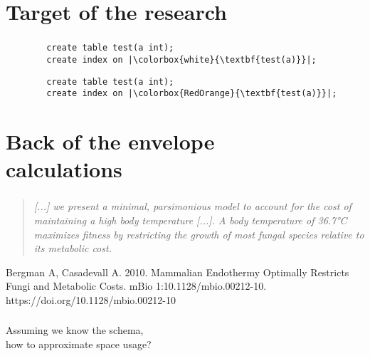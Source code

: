 \documentclass[usenames,dvipsnames, 18pt, compress, aspectratio=169]{beamer}
\begin{document}
\section{Target of the research}

\begin{frame}[fragile]{}
    \frametitle{}

    \begin{overprint}[\textwidth]
        \begin{verbatim}
        create table test(a int);
        create index on |\colorbox{white}{\textbf{test(a)}}|;
        \end{verbatim}

        \begin{verbatim}
        create table test(a int);
        create index on |\colorbox{RedOrange}{\textbf{test(a)}}|;
        \end{verbatim}
    \end{overprint}

\end{frame}

\section{Back of the envelope\\ calculations}

\begin{frame}[fragile]{}
    \frametitle{}

    \blockquote{\it
        [...] we present a minimal, parsimonious model to account for the cost
        of maintaining a high body temperature [...]. A body temperature of
        36.7°C maximizes fitness by restricting the growth of most fungal
        species relative to its metabolic cost.
    }

    \linespread{0.5}
    \vspace{0.5cm}
    \color{black}\fontsize{6pt}{0}\selectfont
        Bergman A, Casadevall A. 2010. Mammalian Endothermy Optimally Restricts
        Fungi and Metabolic Costs. mBio 1:10.1128/mbio.00212-10.
        https://doi.org/10.1128/mbio.00212-10
    \linespread{1.5}

\end{frame}

\begin{frame}[fragile]{}
    \frametitle{}

    Assuming we know the schema,\\
    how to approximate space usage?
\end{frame}
\end{document}
